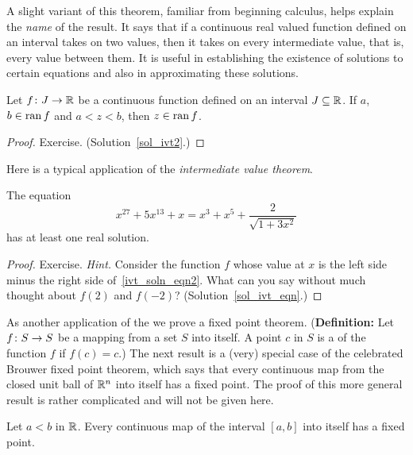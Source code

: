 A slight variant of this theorem, familiar from beginning calculus, helps explain the
\emph{name} of the result.  It says that if a continuous real valued function defined on an
interval takes on two values, then it takes on every intermediate value, that is, every value
between them. It is useful in establishing the existence of solutions to certain equations and
also in approximating these solutions.


\begin{thm}\label{thm_ivt2}  Let $f \colon J
\rightarrow \mathbb{R}$ be a continuous function defined on an interval $J \subseteq \mathbb{R}$. If $a$, $b \in \operatorname{ran}
f$ and $a < z < b$, then $z \in \operatorname{ran} f$.
\end{thm}

\begin{proof} Exercise.  (Solution~\ref{sol_ivt2}.)   \ns  \end{proof}

Here is a typical application of the \emph{intermediate value theorem}.

\begin{exam}\label{exam_ivt_eqn} The equation
 \begin{equation}\label{ivt_soln_eqn2}
   x^{27} + 5x^{13} + x = x^3+ x^5 + \frac2{\sqrt{1+3x^2}}
 \end{equation}
has at least one real solution.
\end{exam}

\begin{proof}  Exercise.  \emph{Hint.}  Consider the function $f$
whose value at $x$ is the left side minus the right side of~\eqref{ivt_soln_eqn2}. What can
you say without much thought about $f(2)$ and $f(-2)$?  (Solution~\ref{sol_ivt_eqn}.)   \ns
\end{proof}

As another application of the  we prove a fixed point
theorem. (\textbf{Definition:} Let $f \colon S \rightarrow S$ be a mapping from a set $S$ into
itself. A point $c$ in $S$ is a
 of the function $f$ if $f(c) = c$.)  The next result is a (very) special case
of the celebrated Brouwer fixed point theorem, which says that every continuous map from the
closed unit ball of $\mathbb{R}^n$ into itself has a fixed point. The proof of this more general
result is rather complicated and will not be given here.

\begin{prop}\label{prop_ivt_fp} Let $a < b$ in $\mathbb{R}$.  Every continuous map of the interval
$[a,b]$ into itself has a fixed point.
\end{prop}

